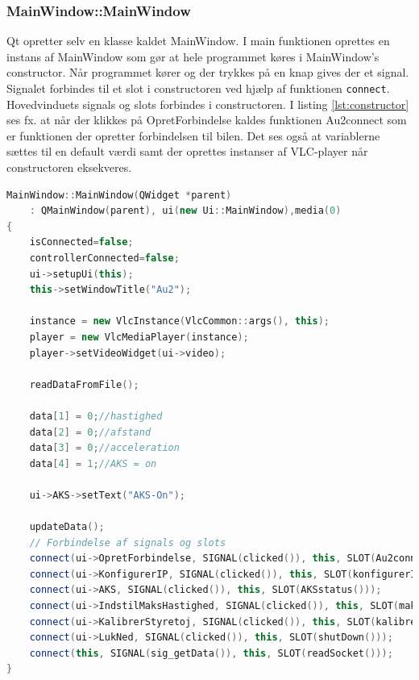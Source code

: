 \subsubsection{MainWindow::MainWindow}
Qt opretter selv en klasse kaldet MainWindow. I main funktionen oprettes en instans af MainWindow som gør at hele programmet køres i MainWindow's constructor. Når programmet kører og der trykkes på en knap gives der et signal. Signalet forbindes til et slot i constructoren ved hjælp af funktionen \texttt{connect}. Hovedvinduets signals og slots forbindes i constructoren. I listing \ref{lst:constructor} ses fx. at når der klikkes på OpretForbindelse kaldes funktionen Au2connect som er funktionen der opretter forbindelsen til bilen. Det ses også at variablerne sættes til en default værdi samt der oprettes instanser af VLC-player når constructoren eksekveres. 
\begin{lstlisting}[caption={MainWindows constructor},label=lst:constructor, language=c++]
MainWindow::MainWindow(QWidget *parent)
    : QMainWindow(parent), ui(new Ui::MainWindow),media(0)
{
    isConnected=false;
    controllerConnected=false;
    ui->setupUi(this);
    this->setWindowTitle("Au2");

    instance = new VlcInstance(VlcCommon::args(), this);
    player = new VlcMediaPlayer(instance);
    player->setVideoWidget(ui->video);

    readDataFromFile();

    data[1] = 0;//hastighed
    data[2] = 0;//afstand
    data[3] = 0;//acceleration
    data[4] = 1;//AKS = on

    ui->AKS->setText("AKS-On");

    updateData();
    // Forbindelse af signals og slots 
    connect(ui->OpretForbindelse, SIGNAL(clicked()), this, SLOT(Au2connect()));
    connect(ui->KonfigurerIP, SIGNAL(clicked()), this, SLOT(konfigurerIP()));
    connect(ui->AKS, SIGNAL(clicked()), this, SLOT(AKSstatus()));
    connect(ui->IndstilMaksHastighed, SIGNAL(clicked()), this, SLOT(maksHastighed()));
    connect(ui->KalibrerStyretoj, SIGNAL(clicked()), this, SLOT(kalibrerStyretoj()));
    connect(ui->LukNed, SIGNAL(clicked()), this, SLOT(shutDown()));
    connect(this, SIGNAL(sig_getData()), this, SLOT(readSocket()));
}
\end{lstlisting}
